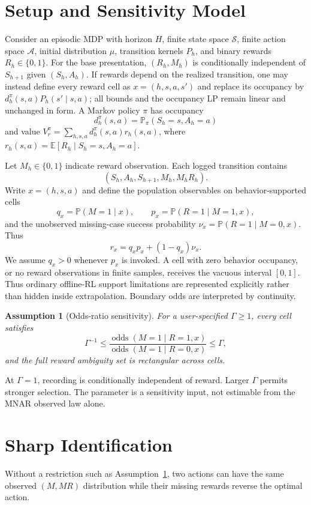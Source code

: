 \documentclass[letterpaper]{article}
\newtheorem{assumption}[theorem]{Assumption}
\theoremstyle{remark}
\newcommand{\E}{\mathbb{E}}
\newcommand{\Prb}{\mathbb{P}}
\newcommand{\cS}{\mathcal{S}}
\newcommand{\cA}{\mathcal{A}}
\newcommand{\odds}{\operatorname{odds}}
\begin{document}
\section{Setup and Sensitivity Model}
Consider an episodic MDP with horizon $H$, finite state space $\cS$, finite action space $\cA$, initial distribution $\mu$, transition kernels $P_h$, and binary rewards $R_h\in\{0,1\}$. For the base presentation, $(R_h,M_h)$ is conditionally independent of $S_{h+1}$ given $(S_h,A_h)$. If rewards depend on the realized transition, one may instead define every reward cell as $x=(h,s,a,s')$ and replace its occupancy by $d_h^\pi(s,a)P_h(s'\mid s,a)$; all bounds and the occupancy LP remain linear and unchanged in form. A Markov policy $\pi$ has occupancy
\[
 d_h^\pi(s,a)=\Prb_\pi(S_h=s,A_h=a)
\]
and value $V_r^\pi=\sum_{h,s,a}d_h^\pi(s,a)r_h(s,a)$, where $r_h(s,a)=\E[R_h\mid S_h=s,A_h=a]$.

Let $M_h\in\{0,1\}$ indicate reward observation. Each logged transition contains
\[
(S_h,A_h,S_{h+1},M_h,M_hR_h).
\]
Write $x=(h,s,a)$ and define the population observables on behavior-supported cells
\[
q_x=\Prb(M=1\mid x),\qquad
p_x=\Prb(R=1\mid M=1,x),
\]
and the unobserved missing-case success probability $\nu_x=\Prb(R=1\mid M=0,x)$. Thus
\begin{equation}
 r_x=q_xp_x+(1-q_x)\nu_x. \label{eq:decomp}
\end{equation}
We assume $q_x>0$ whenever $p_x$ is invoked. A cell with zero behavior occupancy, or no reward observations in finite samples, receives the vacuous interval $[0,1]$. Thus ordinary offline-RL support limitations are represented explicitly rather than hidden inside extrapolation. Boundary odds are interpreted by continuity.

\begin{assumption}[Odds-ratio sensitivity]\label{ass:gamma}
For a user-specified $\Gamma\geq1$, every cell satisfies
\begin{equation}
\Gamma^{-1}\leq
\frac{\odds(M=1\mid R=1,x)}{\odds(M=1\mid R=0,x)}
\leq\Gamma, \label{eq:gamma}
\end{equation}
and the full reward ambiguity set is rectangular across cells.
\end{assumption}
At $\Gamma=1$, recording is conditionally independent of reward. Larger $\Gamma$ permits stronger selection. The parameter is a sensitivity input, not estimable from the MNAR observed law alone.

\section{Sharp Identification}
Without a restriction such as Assumption~\ref{ass:gamma}, two actions can have the same observed $(M,MR)$ distribution while their missing rewards reverse the optimal action.
\end{document}
